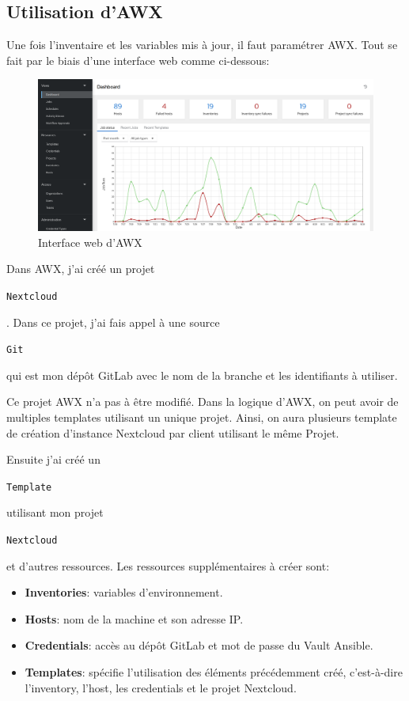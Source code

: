 \documentclass[12pt, a4paper, twoside]{article}
\begin{document}
\subsection{Utilisation d'AWX}
Une fois l'inventaire et les variables mis à jour, il faut paramétrer AWX. 
Tout se fait par le biais d'une interface web comme ci-dessous:
\begin{figure}[!ht]
    \centering
    \includegraphics[width=\textwidth]{src/interface_awx.png}
    \caption{Interface web d'AWX}
    \label{fig:awx}
\end{figure}

Dans AWX, j'ai créé un projet \begin{code}\texttt{\gls{Nextcloud}}\end{code}. 
Dans ce projet, j'ai fais appel à une source \begin{code}\texttt{Git}\end{code} qui est mon dépôt \gls{GitLab} avec le nom de la branche et les identifiants à utiliser. 

Ce projet AWX n'a pas à être modifié.
Dans la logique d'AWX, on peut avoir de multiples templates utilisant un unique projet.
Ainsi, on aura plusieurs template de création d'instance \gls{Nextcloud} par client utilisant le même Projet.

Ensuite j'ai créé un \begin{code}\texttt{Template}\end{code} utilisant mon projet \begin{code}\texttt{\gls{Nextcloud}}\end{code} et d'autres ressources. 
Les ressources supplémentaires à créer sont:
\begin{itemize}
    \item \textbf{Inventories}: variables d'environnement. 
    \item \textbf{Hosts}: nom de la machine et son adresse \gls{IP}.
    \item \textbf{Credentials}:  accès au dépôt \gls{GitLab} et mot de passe du Vault \gls{Ansible}.
    \item \textbf{Templates}: spécifie l'utilisation des éléments précédemment créé, c'est-à-dire l'inventory, l'host, les credentials et le projet \gls{Nextcloud}.
\end{itemize}
\end{document}
